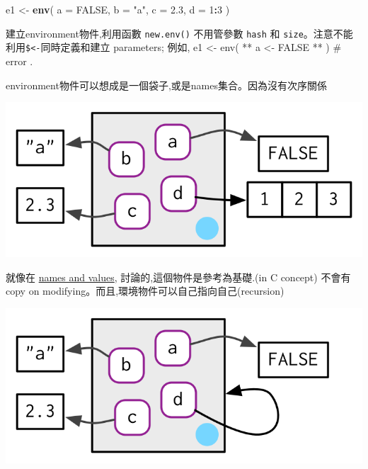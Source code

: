 \documentclass[]{book}
\newenvironment{Shaded}{\begin{snugshade}}{\end{snugshade}}
\newcommand{\DataTypeTok}[1]{\textcolor[rgb]{0.13,0.29,0.53}{#1}}
\newcommand{\DecValTok}[1]{\textcolor[rgb]{0.00,0.00,0.81}{#1}}
\newcommand{\FloatTok}[1]{\textcolor[rgb]{0.00,0.00,0.81}{#1}}
\newcommand{\KeywordTok}[1]{\textcolor[rgb]{0.13,0.29,0.53}{\textbf{#1}}}
\newcommand{\NormalTok}[1]{#1}
\newcommand{\OperatorTok}[1]{\textcolor[rgb]{0.81,0.36,0.00}{\textbf{#1}}}
\newcommand{\OtherTok}[1]{\textcolor[rgb]{0.56,0.35,0.01}{#1}}
\newcommand{\StringTok}[1]{\textcolor[rgb]{0.31,0.60,0.02}{#1}}
\theoremstyle{definition}
\theoremstyle{definition}
\theoremstyle{definition}
\theoremstyle{remark}
\begin{document}
\begin{Shaded}
\begin{Highlighting}[]
\NormalTok{e1 <-}\StringTok{ }\KeywordTok{env}\NormalTok{(}
  \DataTypeTok{a =} \OtherTok{FALSE}\NormalTok{,}
  \DataTypeTok{b =} \StringTok{"a"}\NormalTok{,}
  \DataTypeTok{c =} \FloatTok{2.3}\NormalTok{,}
  \DataTypeTok{d =} \DecValTok{1}\OperatorTok{:}\DecValTok{3}
\NormalTok{)}
\end{Highlighting}
\end{Shaded}

建立environment物件,利用函數 \texttt{new.env()} 不用管參數 \texttt{hash}
和 \texttt{size}。注意不能利用\texttt{\$\textless{}-}同時定義和建立
parameters; 例如, e1 \textless{}- env( ** a \textless{}- FALSE ** ) \#
error .

environment物件可以想成是一個袋子,或是names集合。因為沒有次序關係

\begin{center}\includegraphics{diagrams/environments/bindings} \end{center}

就像在 \protect\hyperlink{env-modify}{names and values},
討論的,這個物件是參考為基礎.(in C concept) 不會有copy on
modifying。而且,環境物件可以自己指向自己(recursion)

\begin{Shaded}
\end{Shaded}

\begin{center}\includegraphics{diagrams/environments/loop} \end{center}
\end{document}
